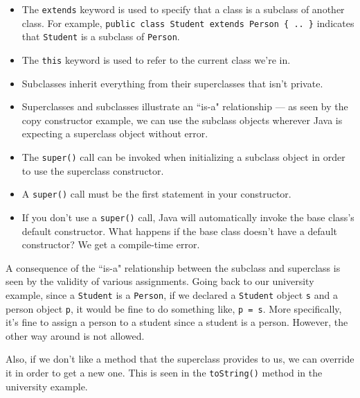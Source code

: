 \begin{itemize}
    \item The \verb!extends! keyword is used to specify that a class is a subclass of another class. For example, \verb!public class Student extends Person { .. }! indicates that \verb!Student! is a subclass of \verb!Person!.
    \item The \verb!this! keyword is used to refer to the current class we're in. 
    \item Subclasses inherit everything from their superclasses that isn't private.
    \item Superclasses and subclasses illustrate an ``is-a" relationship --- as seen by the copy constructor example, we can use the subclass objects wherever Java is expecting a superclass object without error.
    \item The \verb!super()! call can be invoked when initializing a subclass object in order to use the superclass constructor. 
    \item A \verb!super()! call must be the first statement in your constructor. 
    \item If you don't use a \verb!super()! call, Java will automatically invoke the base class's default constructor. What happens if the base class doesn't have a default constructor? We get a compile-time error.
\end{itemize}

A consequence of the ``is-a" relationship between the subclass and superclass is seen by the validity of various assignments. Going back to our university example, since a \verb!Student! is a \verb!Person!, if we declared a \verb!Student! object \verb!s! and a person object \verb!p!, it would be fine to do something like, \verb!p = s!. More specifically, it's fine to assign a person to a student since a student is a person. However, the other way around is not allowed.


Also, if we don't like a method that the superclass provides to us, we can override it in order to get a new one. This is seen in the \verb!toString()! method in the university example.